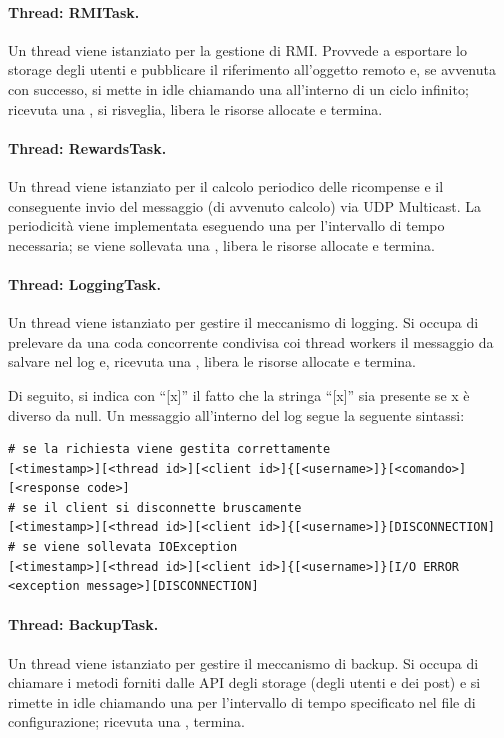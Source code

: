 \documentclass[11pt, italian, openany]{book}
\begin{document}
\begin{sloppypar}
\paragraph*{Thread: RMITask.}
Un thread  viene istanziato per la gestione di RMI. Provvede a esportare lo storage degli utenti e pubblicare il riferimento
all'oggetto remoto e, se avvenuta con successo, si mette in idle chiamando una  all'interno di un ciclo infinito; ricevuta
una , si risveglia, libera le risorse allocate e termina.

\paragraph*{Thread: RewardsTask.}
Un thread  viene istanziato per il calcolo periodico delle ricompense e il conseguente invio del messaggio (di avvenuto
calcolo) via UDP Multicast. La periodicit\`a viene implementata eseguendo una  per l'intervallo di tempo necessaria; se viene
sollevata una , libera le risorse allocate e termina.

\paragraph*{Thread: LoggingTask.}
Un thread  viene istanziato per gestire il meccanismo di logging. Si occupa di prelevare da una coda concorrente condivisa
coi thread workers il messaggio da salvare nel log e, ricevuta una , libera le risorse allocate e termina.

Di seguito, si indica con ``{[x]}'' il fatto che la stringa ``[x]'' sia presente se x \`e diverso da null.
Un messaggio all'interno del log segue la seguente sintassi:
\begin{lstlisting}[style=code]
# se la richiesta viene gestita correttamente
[<timestamp>][<thread id>][<client id>]{[<username>]}[<comando>][<response code>]
# se il client si disconnette bruscamente
[<timestamp>][<thread id>][<client id>]{[<username>]}[DISCONNECTION]
# se viene sollevata IOException
[<timestamp>][<thread id>][<client id>]{[<username>]}[I/O ERROR <exception message>][DISCONNECTION]
\end{lstlisting}

\paragraph*{Thread: BackupTask.}
Un thread  viene istanziato per gestire il meccanismo di backup. Si occupa di chiamare i metodi forniti dalle API degli
storage (degli utenti e dei post) e si rimette in idle chiamando una  per l'intervallo di tempo specificato nel file di
configurazione; ricevuta una , termina.


\end{sloppypar}
\end{document}
